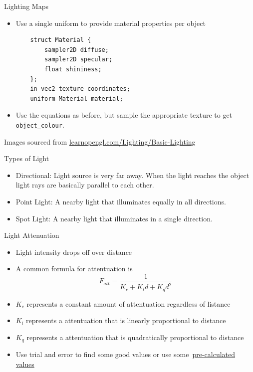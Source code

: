 \documentclass{beamer}
\newcommand{\hrefhand}[2]{\raisebox{-0.4ex}{\HandRight}\,\href{#1}{#2}}
\begin{document}
\begin{frame}[fragile]{Lighting Maps}
\begin{itemize}
\begin{center}
              \end{center}
        \item Use a single uniform to provide material properties per object
              \footnotesize{
                  \begin{verbatim}
    struct Material {
        sampler2D diffuse;
        sampler2D specular;
        float shininess;
    };
    in vec2 texture_coordinates;
    uniform Material material;
\end{verbatim}
              }
        \item Use the equations as before, but sample the appropriate texture to get {\color{blue}\verb"object_colour"}.
    \end{itemize}
    \vfill{}
    {\footnotesize{Images sourced from \url{learnopengl.com/Lighting/Basic-Lighting}}}
\end{frame}

\begin{frame}[fragile]{Types of Light}
    \begin{itemize}
        \item Directional: Light source is very far away. When the light reaches the object
              light rays are basically parallel to each other.
        \item Point Light: A nearby light that illuminates equally in all directions.
        \item Spot Light: A nearby light that illuminates in a single direction.
    \end{itemize}
\end{frame}

\begin{frame}[fragile]{Light Attenuation}
    \begin{itemize}
        \item Light intensity drops off over distance
        \item A common formula for attentuation is
              $$F_{att} = \frac{1}{K_{c} + K_{l}d + K_{q}d^{2}}$$
        \item $K_{c}$ represents a constant amount of attentuation regardless of listance
        \item $K_{l}$ represents a attentuation that is linearly proportional to distance
        \item $K_{q}$ represents a attentuation that is quadratically proportional to distance
        \item Use trial and error to find some good values or use some \hrefhand{https://wiki.ogre3d.org/tiki-index.php?page=-Point+Light+Attenuation}{\color{blue}pre-calculated values}
    \end{itemize}
\end{frame}
\end{document}
